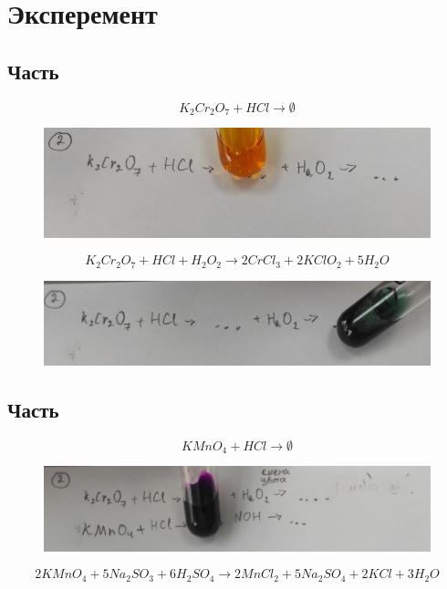 \section{Эксперемент}
\subsection{Часть}
\begin{equation} 
    K_2Cr_2O_7 + HCl \xrightarrow{} \emptyset 
\end{equation} 
\begin{figure}[h]
    \centering
    \includegraphics[width=1\linewidth]{Ex_3/Ex_3_1_1.jpg}
     \caption{}
    \label{ex_3_1_1}
\end{figure}
\begin{equation} 
    K_2Cr_2O_7 + HCl + H_2O_2 \xrightarrow{} 
    2CrCl_3 + 2KClO_2 + 5H_2O        
\end{equation} 
\begin{figure}[h]
    \centering
    \includegraphics[width=1\linewidth]{Ex_3/Ex_3_1_2.jpg}
     \caption{}
    \label{ex_3_1_2}
\end{figure}


\subsection{Часть}
\begin{equation} 
    KMnO_4 + HCl \xrightarrow{} \emptyset 
\end{equation} 
\begin{figure}[h]
    \centering
    \includegraphics[width=1\linewidth]{Ex_3/Ex_3_2_1.jpg}
     \caption{}
    \label{ex_3_2_1}
\end{figure}
\begin{equation} 
    2KMnO_4 + 5Na_2SO_3 + 6H_2SO_4 \xrightarrow{}
    2MnCl_2 + 5Na_2SO_4 + 2KCl + 3H_2O
\end{equation} 

